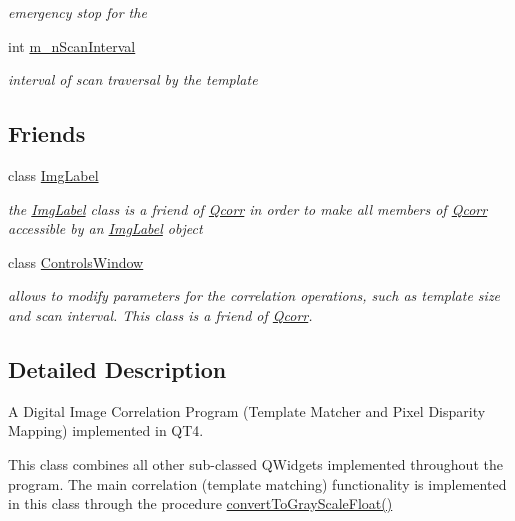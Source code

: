 \begin{CompactItemize}
\begin{CompactList}\small\item\em emergency stop for the \item\end{CompactList}\item 
\hypertarget{classQcorr_b07379fbbd7be906023eb5ec4d555931}{
int \hyperlink{classQcorr_b07379fbbd7be906023eb5ec4d555931}{m\_\-nScanInterval}}
\label{classQcorr_b07379fbbd7be906023eb5ec4d555931}

\begin{CompactList}\small\item\em interval of scan traversal by the template \item\end{CompactList}\end{CompactItemize}
\subsection*{Friends}
\begin{CompactItemize}
\item 
class \hyperlink{classQcorr_5b4b2caf4c596b601dd096785e4a32b9}{ImgLabel}
\begin{CompactList}\small\item\em the \hyperlink{classImgLabel}{ImgLabel} class is a friend of \hyperlink{classQcorr}{Qcorr} in order to make all members of \hyperlink{classQcorr}{Qcorr} accessible by an \hyperlink{classImgLabel}{ImgLabel} object \item\end{CompactList}\item 
class \hyperlink{classQcorr_ce49e9a34b2d2df1e7683be4cacba1d8}{ControlsWindow}
\begin{CompactList}\small\item\em allows to modify parameters for the correlation operations, such as template size and scan interval. This class is a friend of \hyperlink{classQcorr}{Qcorr}. \item\end{CompactList}\end{CompactItemize}


\subsection{Detailed Description}
A Digital Image Correlation Program (Template Matcher and Pixel Disparity Mapping) implemented in QT4. 

This class combines all other sub-classed QWidgets implemented throughout the program. The main correlation (template matching) functionality is implemented in this class through the procedure \hyperlink{classQcorr_d1b26ace597c0c4a0f64a0bd9576d4fc}{convertToGrayScaleFloat()}

